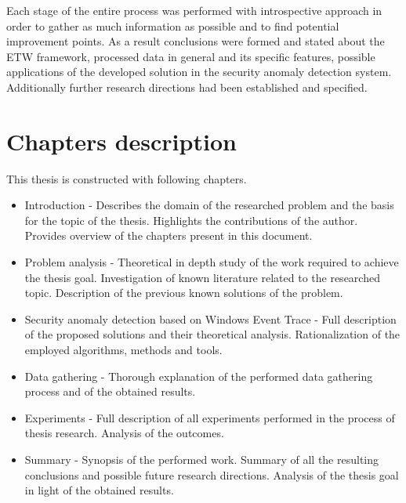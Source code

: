 \documentclass[a4paper,twoside,12pt]{book}
\begin{document}
Each stage of the entire process was performed with introspective approach in order to gather as much information 
as possible and to find potential improvement points. As a result conclusions were formed and stated about
the ETW framework, processed data in general and its specific features, possible applications of the developed
solution in the security anomaly detection system. Additionally further research directions had been established and specified.

\section{Chapters description}

This thesis is constructed with following chapters.
\begin{itemize}
	\item Introduction - Describes the domain of the researched problem and the basis for the 
	topic of the thesis. Highlights the contributions of the author. Provides overview of the 
	chapters present in this document.
	\item Problem analysis - Theoretical in depth study of the work required to achieve the thesis
	goal. Investigation of known literature related to the researched topic. Description of the 
	previous known solutions of the problem. 
	\item Security anomaly detection based on Windows Event Trace - Full description of the proposed
	solutions and their theoretical analysis. Rationalization of the employed algorithms, methods 
	and tools.
	\item Data gathering - Thorough explanation of the performed data gathering process and of 
	the obtained results.
 	\item Experiments - Full description of all experiments performed in the process of thesis 
 	research. Analysis of the outcomes.
	\item Summary - Synopsis of the performed work. Summary of all the resulting conclusions and 
	possible future research directions. Analysis of the thesis goal in light of the obtained
	results. 
\end{itemize}


\end{document}

